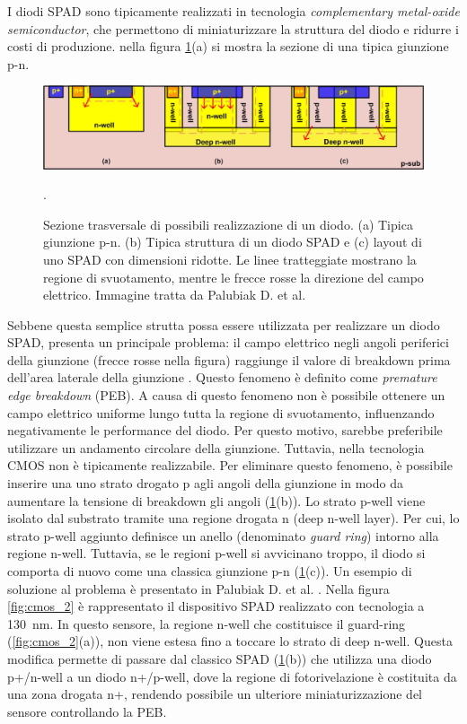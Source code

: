 I diodi SPAD sono tipicamente realizzati in tecnologia \textit{complementary metal-oxide semiconductor}, che permettono di miniaturizzare la struttura del diodo e ridurre i costi di produzione. nella figura \ref{fig:cmos}(a) si mostra la sezione di una tipica giunzione p-n.
\begin{figure}[tbh]
	\centering
	\includegraphics[width=0.8\linewidth]{./ImageFiles/cmos.jpg}
	\caption{Sezione trasversale di possibili realizzazione di un diodo. (a) Tipica giunzione p-n. (b) Tipica struttura di un diodo SPAD e (c) layout di uno SPAD con dimensioni ridotte. Le linee tratteggiate mostrano la regione di svuotamento, mentre le frecce rosse la direzione del campo elettrico. Immagine tratta da Palubiak D. et al. \cite{Palubiak2011}}. 
	\label{fig:cmos}
\end{figure} 
Sebbene questa semplice strutta possa essere utilizzata per realizzare un diodo SPAD, presenta un principale problema: il campo elettrico negli angoli periferici della giunzione (frecce rosse nella figura) raggiunge il valore di breakdown prima dell'area laterale della giunzione \cite{Palubiak2011}. Questo fenomeno è definito come \textit{premature edge breakdown} (PEB). A causa di questo fenomeno non è possibile ottenere un campo elettrico uniforme lungo tutta la regione di svuotamento, influenzando negativamente le performance del diodo. Per questo motivo, sarebbe preferibile utilizzare un andamento circolare della giunzione. Tuttavia, nella tecnologia CMOS non è tipicamente realizzabile. Per eliminare questo fenomeno, è possibile inserire una uno strato drogato p agli angoli della giunzione in modo da aumentare la tensione di breakdown gli angoli (\Fig\ref{fig:cmos}(b)). Lo strato p-well viene isolato dal substrato tramite una regione drogata n (deep n-well layer). Per cui, lo strato p-well aggiunto definisce un anello (denominato \textit{guard ring}) intorno alla regione n-well. Tuttavia, se le regioni p-well si avvicinano troppo, il diodo si comporta di nuovo come una classica giunzione p-n (\Fig\ref{fig:cmos}(c)). Un esempio di soluzione al problema è presentato in Palubiak D. et al. \cite{Palubiak2011}. Nella figura \ref{fig:cmos_2} è rappresentato il dispositivo SPAD realizzato con tecnologia a \SI{130}{\nano\meter}. In questo sensore, la regione n-well che costituisce il guard-ring (\Fig\ref{fig:cmos_2}(a)), non viene estesa fino a toccare lo strato di deep n-well. Questa modifica permette di passare dal classico SPAD (\Fig\ref{fig:cmos}(b)) che utilizza una diodo p+/n-well a un diodo n+/p-well, dove la regione di fotorivelazione è costituita da una zona drogata n+, rendendo possibile un ulteriore miniaturizzazione del sensore controllando la PEB.   
